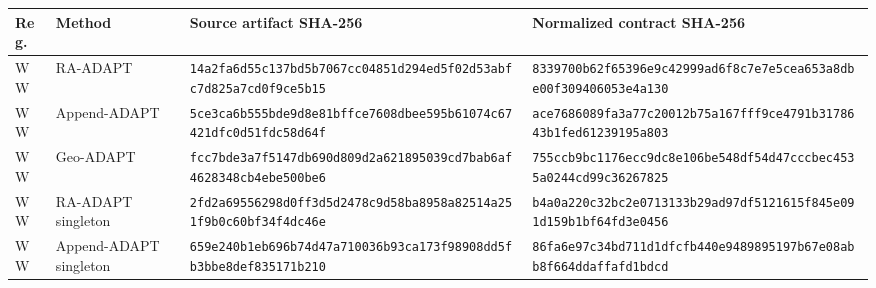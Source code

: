 \documentclass[10pt,letterpaper]{article}
\begin{document}
\tiny
\begin{longtable}{@{}llp{2.55in}p{2.55in}@{}}
\toprule
Reg. & Method & Source artifact SHA-256 & Normalized contract SHA-256 \\
\midrule
WW & RA-ADAPT & \texttt{14a2fa6d}\allowbreak{}\texttt{55c137bd}\allowbreak{}\texttt{5b7067cc}\allowbreak{}\texttt{04851d29}\allowbreak{}\texttt{4ed5f02d}\allowbreak{}\texttt{53abfc7d}\allowbreak{}\texttt{825a7cd0}\allowbreak{}\texttt{f9ce5b15}\allowbreak{} & \texttt{8339700b}\allowbreak{}\texttt{62f65396}\allowbreak{}\texttt{e9c42999}\allowbreak{}\texttt{ad6f8c7e}\allowbreak{}\texttt{7e5cea65}\allowbreak{}\texttt{3a8dbe00}\allowbreak{}\texttt{f3094060}\allowbreak{}\texttt{53e4a130}\allowbreak{} \\
WW & Append-ADAPT & \texttt{5ce3ca6b}\allowbreak{}\texttt{555bde9d}\allowbreak{}\texttt{8e81bffc}\allowbreak{}\texttt{e7608dbe}\allowbreak{}\texttt{e595b610}\allowbreak{}\texttt{74c67421}\allowbreak{}\texttt{dfc0d51f}\allowbreak{}\texttt{dc58d64f}\allowbreak{} & \texttt{ace76860}\allowbreak{}\texttt{89fa3a77}\allowbreak{}\texttt{c20012b7}\allowbreak{}\texttt{5a167fff}\allowbreak{}\texttt{9ce4791b}\allowbreak{}\texttt{3178643b}\allowbreak{}\texttt{1fed6123}\allowbreak{}\texttt{9195a803}\allowbreak{} \\
WW & Geo-ADAPT & \texttt{fcc7bde3}\allowbreak{}\texttt{a7f5147d}\allowbreak{}\texttt{b690d809}\allowbreak{}\texttt{d2a62189}\allowbreak{}\texttt{5039cd7b}\allowbreak{}\texttt{ab6af462}\allowbreak{}\texttt{8348cb4e}\allowbreak{}\texttt{be500be6}\allowbreak{} & \texttt{755ccb9b}\allowbreak{}\texttt{c1176ecc}\allowbreak{}\texttt{9dc8e106}\allowbreak{}\texttt{be548df5}\allowbreak{}\texttt{4d47cccb}\allowbreak{}\texttt{ec4535a0}\allowbreak{}\texttt{244cd99c}\allowbreak{}\texttt{36267825}\allowbreak{} \\
WW & RA-ADAPT singleton & \texttt{2fd2a695}\allowbreak{}\texttt{56298d0f}\allowbreak{}\texttt{f3d5d247}\allowbreak{}\texttt{8c9d58ba}\allowbreak{}\texttt{8958a825}\allowbreak{}\texttt{14a251f9}\allowbreak{}\texttt{b0c60bf3}\allowbreak{}\texttt{4f4dc46e}\allowbreak{} & \texttt{b4a0a220}\allowbreak{}\texttt{c32bc2e0}\allowbreak{}\texttt{713133b2}\allowbreak{}\texttt{9ad97df5}\allowbreak{}\texttt{121615f8}\allowbreak{}\texttt{45e091d1}\allowbreak{}\texttt{59b1bf64}\allowbreak{}\texttt{fd3e0456}\allowbreak{} \\
WW & Append-ADAPT singleton & \texttt{659e240b}\allowbreak{}\texttt{1eb696b7}\allowbreak{}\texttt{4d47a710}\allowbreak{}\texttt{036b93ca}\allowbreak{}\texttt{173f9890}\allowbreak{}\texttt{8dd5fb3b}\allowbreak{}\texttt{be8def83}\allowbreak{}\texttt{5171b210}\allowbreak{} & \texttt{86fa6e97}\allowbreak{}\texttt{c34bd711}\allowbreak{}\texttt{d1dfcfb4}\allowbreak{}\texttt{40e94898}\allowbreak{}\texttt{95197b67}\allowbreak{}\texttt{e08abb8f}\allowbreak{}\texttt{664ddaff}\allowbreak{}\texttt{afd1bdcd}\allowbreak{} \\

\end{longtable}
\end{document}
